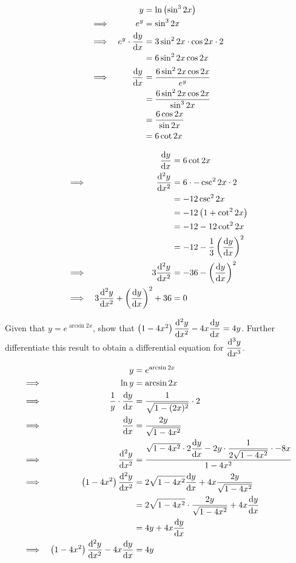 \documentclass{echw}
\begin{document}
    \solution
        \begin{alignat*}{2}
            &&y &= \ln \left(\sin^3 2x\right)\\
            \implies&&e^y &= \sin^3 2x\\
            \implies&&e^y \cdot \dfrac{\mathrm{d} y}{\mathrm{d} x} &= 3\sin^2 2x \cdot \cos 2x \cdot 2\\
            && &= 6\sin^2 2x \cos 2x\\
            \implies&& \dfrac{\mathrm{d} y}{\mathrm{d} x} &= \dfrac{6\sin^2 2x \cos 2x}{e^y}\\
            && &= \dfrac{6\sin^2 2x \cos 2x}{\sin^3 2x}\\
            && &= \dfrac{6 \cos 2x}{\sin 2x}\\
            && &= 6 \cot 2x
        \end{alignat*}
        

        \begin{alignat*}{2}
            &&\dfrac{\mathrm{d} y}{\mathrm{d} x} &= 6\cot 2x\\
            \implies&&\dfrac{\mathrm{d}^{2} y}{\mathrm{d} {x}^{2}} &= 6 \cdot -\csc^2 2x \cdot 2\\
            && &= -12 \csc^2 2x\\
            && &= -12 \left(1 + \cot^2 2x\right)\\
            && &= -12 - 12\cot^2 2x\\
            && &= -12 - \dfrac13 \left(\dfrac{\mathrm{d} y}{\mathrm{d} x}\right)^2\\
            \implies&&3\dfrac{\mathrm{d}^{2} y}{\mathrm{d} {x}^{2}} &= -36 - \left(\dfrac{\mathrm{d} y}{\mathrm{d} x}\right)^2\\
            \implies&& 3\dfrac{\mathrm{d}^{2} y}{\mathrm{d} {x}^{2}} + \left(\dfrac{\mathrm{d} y}{\mathrm{d} x}\right)^2 + 36 &= 0
        \end{alignat*}
        
    \problem{}
        Given that $y = e^{\arcsin{2x}}$, show that $\left(1-4x^2\right)\dfrac{\mathrm{d}^{2} y}{\mathrm{d} {x}^{2}} - 4x\dfrac{\mathrm{d} y}{\mathrm{d} x} = 4y$. Further differentiate this result to obtain a differential equation for $\dfrac{\mathrm{d}^{3} y}{\mathrm{d} {x}^{3}}$.

    \solution
        \begin{alignat*}{2}
            &&y &= e^{\arcsin{2x}}\\
            \implies&& \ln y &= \arcsin{2x}\\
            \implies&& \dfrac1y \cdot \dfrac{\mathrm{d} y}{\mathrm{d} x} &= \dfrac{1}{\sqrt{1 - (2x)^2}} \cdot 2\\
            \implies&& \dfrac{\mathrm{d} y}{\mathrm{d} x} &= \dfrac{2y}{\sqrt{1 - 4x^2}}\\
            \implies&& \dfrac{\mathrm{d}^{2} y}{\mathrm{d} {x}^{2}} &= \dfrac{\sqrt{1 - 4x^2} \cdot 2\dfrac{\mathrm{d} y}{\mathrm{d} x} - 2y \cdot \dfrac{1}{2\sqrt{1-4x^2}} \cdot -8x}{1-4x^2}\\
            \implies&& \left(1-4x^2\right)\dfrac{\mathrm{d}^{2} y}{\mathrm{d} {x}^{2}} &= 2\sqrt{1 - 4x^2} \dfrac{\mathrm{d} y}{\mathrm{d} x} + 4x \dfrac{2y}{\sqrt{1-4x^2}}\\
            && &= 2\sqrt{1 - 4x^2} \cdot \dfrac{2y}{\sqrt{1 - 4x^2}} + 4x \dfrac{\mathrm{d} y}{\mathrm{d} x} \\
            && &= 4y + 4x \dfrac{\mathrm{d} y}{\mathrm{d} x} \\
            \implies&& \left(1-4x^2\right)\dfrac{\mathrm{d}^{2} y}{\mathrm{d} {x}^{2}} -4x \dfrac{\mathrm{d} y}{\mathrm{d} x} &= 4y \\
        \end{alignat*}
\end{document}
